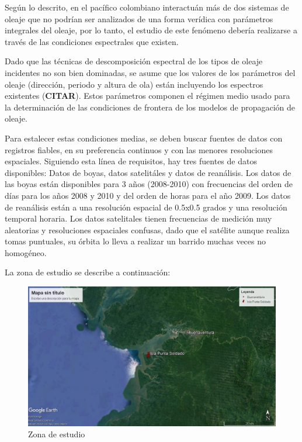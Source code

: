 \documentclass[5p,times,authoryear]{elsarticle}
\begin{document}
Según lo descrito, en el pacífico colombiano interactuán más de dos sistemas de oleaje que no podrían ser analizados de una forma verídica con parámetros integrales del oleaje, por lo tanto, el estudio de este fenómeno debería realizarse a través de las condiciones espectrales que existen.

Dado que las técnicas de descomposición espectral de los tipos de oleaje incidentes no son bien dominadas, se asume que los valores de los parámetros del oleaje (dirección, periodo y altura de ola) están incluyendo los espectros existentes (\textbf{CITAR}). Estos parámetros componen el régimen medio usado para la determinación de las condiciones de frontera de los modelos de propagación de oleaje.

Para estalecer estas condiciones medias, se deben buscar fuentes de datos con registros fiables, en su preferencia continuos y con las menores resoluciones espaciales. Siguiendo esta línea de requisitos, hay tres fuentes de datos disponibles: Datos de boyas, datos satelitáles y datos de reanálisis. Los datos de las boyas están disponibles para 3 años (2008-2010) con frecuencias del orden de días para los años 2008 y 2010 y del orden de horas para el año 2009. Los datos de reanálisis están a una resolución espacial de 0.5x0.5 grados y una resolución temporal horaria. Los datos satelitales tienen frecuencias de medición muy aleatorias y resoluciones espaciales confusas, dado que el satélite aunque realiza tomas puntuales, su órbita lo lleva a realizar un barrido muchas veces no homogéneo.

La zona de estudio se describe a continuación:

\begin{figure}[h]
    \centering
    \includegraphics[scale=0.25]{Graficas/Zona}
    \caption{Zona de estudio}
    \label{fig:0}
\end{figure}
\end{document}
